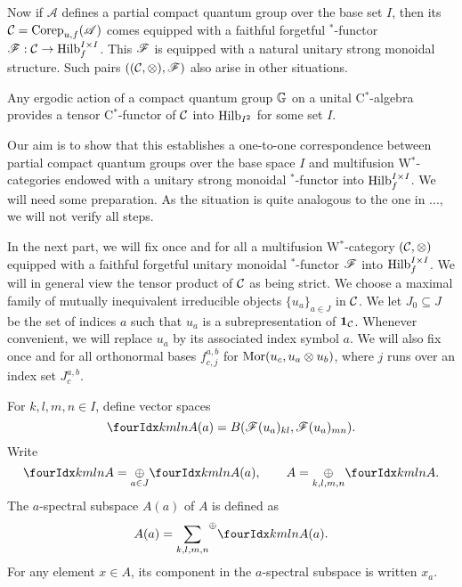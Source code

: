 Now if $\mathscr{A}$ defines a partial compact quantum group over the base set $I$, then its $\mathcal{C} = \mathrm{Corep}_{u,f}(\mathscr{A})$ comes equipped with a faithful forgetful $^*$-functor $\mathscr{F}: \mathcal{C} \rightarrow \mathrm{Hilb}_f^{I\times I}$. This $\mathscr{F}$ is equipped with a natural unitary strong monoidal structure.  Such pairs $((\mathcal{C},\otimes),\mathscr{F})$ also arise in other situations.

\begin{Exa}  Any ergodic action of a compact quantum group $\mathbb{G}$ on a unital C$^*$-algebra provides a tensor C$^*$-functor of $\mathcal{C}$ into $\mathrm{Hilb}_{I^2}$ for some set $I$.

\end{Exa}

Our aim is to show that this establishes a one-to-one correspondence between partial compact quantum groups over the base space $I$ and multifusion W$^*$-categories endowed with a unitary strong monoidal $^*$-functor into $\mathrm{Hilb}_f^{I\times I}$. We will need some preparation. As the situation is quite analogous to the one in ..., we will not verify all steps.

In the next part, we will fix once and for all a multifusion W$^*$-category $(\mathcal{C},\otimes)$ equipped with a faithful forgetful unitary monoidal $^*$-functor $\mathscr{F}$ into $\mathrm{Hilb}_f^{I\times  I}$. %
We will in general view the tensor product of $\mathcal{C}$ as being strict.
We  choose a maximal family of mutually inequivalent irreducible objects $\{u_a\}_{a\in J}$ in $\mathcal{C}$. We let $J_0\subseteq J$ be the set of indices $a$ such that $u_a$ is a subrepresentation of $\mathbf{1}_{\mathcal{C}}$. Whenever convenient, we will replace $u_a$ by its associated index symbol $a$. 
We will also fix once and for all orthonormal bases $f_{c,j}^{a,b}$ for $\mathrm{Mor}(u_c,u_a\otimes u_b)$, where $j$ runs over an index set $J^{a,b}_{c}$.

\begin{Def} For $k,l,m,n\in I$, define vector spaces \[\Gr{A}{k}{l}{m}{n}(a) = B(\Forget(u_a)_{kl},\Forget(u_a)_{mn}).\] Write \[\Gr{A}{k}{l}{m}{n} = \underset{a\in J}{\oplus} \Gr{A}{k}{l}{m}{n}(a),\qquad A = \underset{k,l,m,n}{\oplus} \Gr{A}{k}{l}{m}{n}.\] The $a$-spectral subspace $A(a)$ of $A$ is defined as \[A(a) = \osum{k,l,m,n} \Gr{A}{k}{l}{m}{n}(a).\] For any element $x\in A$, its component in the $a$-spectral subspace is written $x_a$.
\end{Def} 

